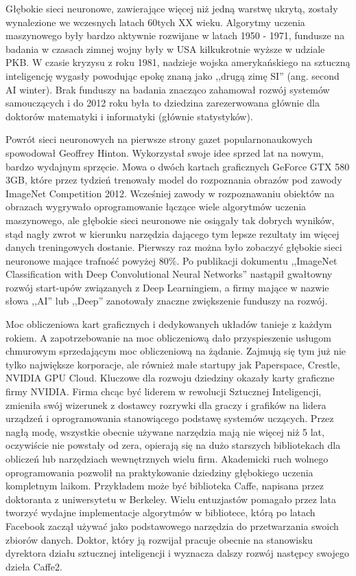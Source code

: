 \documentclass[12pt,a4paper,twoside,titlepage,openright]{book}
\begin{document}
Głębokie sieci neuronowe, zawierające więcej niż jedną warstwę ukrytą, zostały wynalezione we wczesnych latach 60tych XX wieku. Algorytmy uczenia maszynowego były bardzo aktywnie rozwijane w latach 1950 - 1971, fundusze na badania w czasach zimnej wojny były w USA kilkukrotnie wyższe w udziale PKB. W czasie kryzysu z roku 1981, nadzieje wojska amerykańskiego na sztuczną inteligencję wygasły powodując epokę znaną jako ,,drugą zimę SI'' (ang. second AI winter). Brak funduszy na badania znacząco zahamował rozwój systemów samouczących i do 2012 roku była to dziedzina zarezerwowana głównie dla doktorów matematyki i informatyki (głównie statystyków). \cite{siteAIhistory}

Powrót sieci neuronowych na pierwsze strony gazet popularnonaukowych spowodował Geoffrey Hinton. Wykorzystał swoje idee sprzed lat na nowym, bardzo wydajnym sprzęcie. Mowa o dwóch kartach graficznych GeForce GTX 580 3GB\cite{NIPS2012_4824}, które przez tydzień trenowały model do rozpoznania obrazów pod zawody ImageNet Competition 2012. Wcześniej zawody w rozpoznawaniu obiektów na obrazach wygrywało oprogramowanie łączące wiele algorytmów uczenia maszynowego, ale głębokie sieci neuronowe nie osiągały tak dobrych wyników, stąd nagły zwrot w kierunku narzędzia dającego tym lepsze rezultaty im więcej danych treningowych dostanie. Pierwszy raz można było zobaczyć głębokie sieci neuronowe mające trafność powyżej 80\%. Po publikacji dokumentu ,,ImageNet Classification with Deep Convolutional Neural Networks'' nastąpił gwałtowny rozwój start-upów związanych z Deep Learningiem, a firmy mające w nazwie słowa ,,AI'' lub ,,Deep'' zanotowały znaczne zwiększenie funduszy na rozwój.

Moc obliczeniowa kart graficznych i dedykowanych układów tanieje z każdym rokiem. A zapotrzebowanie na moc obliczeniową dało przyspieszenie usługom chmurowym sprzedającym moc obliczeniową na żądanie. Zajmują się tym już nie tylko największe korporacje, ale również małe startupy jak Paperspace, Crestle, NVIDIA GPU Cloud. Kluczowe dla rozwoju dziedziny okazały karty graficzne firmy NVIDIA. Firma chcąc być liderem w rewolucji Sztucznej Inteligencji, zmieniła swój wizerunek z dostawcy rozrywki dla graczy i grafików na lidera urządzeń i oprogramowania stanowiącego podstawę systemów uczących. Przez nagłą modę, wszystkie obecnie używane narzędzia mają nie więcej niż 5 lat, oczywiście nie powstały od zera, opierają się na dużo starszych bibliotekach dla obliczeń lub narzędziach wewnętrznych wielu firm. Akademicki ruch wolnego oprogramowania pozwolił na praktykowanie dziedziny głębokiego uczenia kompletnym laikom. Przykładem może być biblioteka Caffe, napisana przez doktoranta z uniwersytetu w Berkeley. Wielu entuzjastów pomagało przez lata tworzyć wydajne implementacje algorytmów w bibliotece, którą po latach Facebook zaczął używać jako podstawowego narzędzia do przetwarzania swoich zbiorów danych. Doktor, który ją rozwijał pracuje obecnie na stanowisku dyrektora działu sztucznej inteligencji i wyznacza dalszy rozwój następcy swojego dzieła Caffe2. \cite{siteJia}
\end{document}
